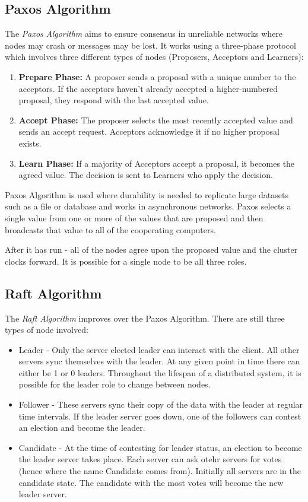 \subsection{Paxos Algorithm}
The \textit{Paxos Algorithm} aims to ensure consensus in unreliable networks where nodes may crash or messages may be lost. It works using a three-phase protocol which involves three different types of nodes (Proposers, Acceptors and Learners):
\begin{enumerate}
    \item \textbf{Prepare Phase:} A proposer sends a proposal with a unique number to the acceptors. If the acceptors haven't already accepted a higher-numbered proposal, they respond with the last accepted value. 
    \item \textbf{Accept Phase:} The proposer selects the most recently accepted value and sends an accept request. Acceptors acknowledge it if no higher proposal exists.
    \item \textbf{Learn Phase:} If a majority of Acceptors accept a proposal, it becomes the agreed value. The decision is sent to Learners who apply the decision. 
\end{enumerate}

Paxos Algorithm is used where durability is needed to replicate large datasets such as a file or database and works in asynchronous networks. Paxos selects a single value from one or more of the values that are proposed and then broadcasts that value to all of the cooperating computers.

After it has run - all of the nodes agree upon the proposed value and the cluster clocks forward. It is possible for a single node to be all three roles. 

\subsection{Raft Algorithm}
The \textit{Raft Algorithm} improves over the Paxos Algorithm. There are still three types of node involved:
\begin{itemize}
    \item Leader - Only the server elected leader can interact with the client. All other servers sync themselves with the leader. At any given point in time there can either be 1 or 0 leaders. Throughout the lifespan of a distributed system, it is possible for the leader role to change between nodes.
    \item Follower - These servers sync their copy of the data with the leader at regular time intervals. If the leader server goes down, one of the followers can contest an election and become the leader.
    \item Candidate - At the time of contesting for leader status, an election to become the leader server takes place. Each server can ask otehr servers for votes (hence where the name Candidate comes from). Initially all servers are in the candidate state. The candidate with the most votes will become the new leader server.
\end{itemize}

